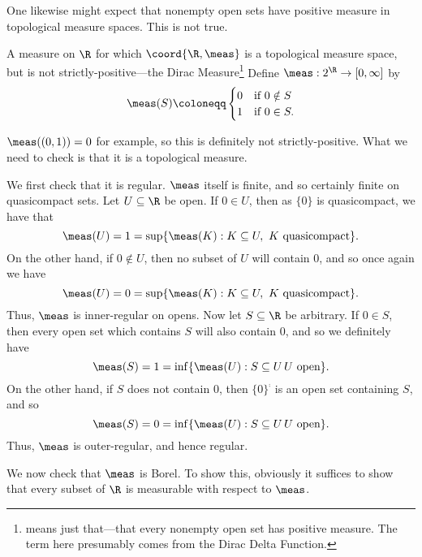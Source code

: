 One likewise might expect that nonempty open sets have positive measure in topological measure spaces.  This is not true.
\begin{exm}{A measure on $\R$ for which $\coord{\R ,\meas}$ is a topological measure space, but is not strictly-positive---the Dirac Measure}{}\footnote{ means just that---that every nonempty open set has positive measure.  The term here presumably comes from the Dirac Delta Function.}
Define $\meas :2^{\R}\rightarrow [0,\infty ]$ by
\begin{equation}
\meas (S)\coloneqq \begin{cases}0 & \text{if }0\notin S \\ 1 & \text{if }0\in S.\end{cases}
\end{equation}

$\meas ((0,1))=0$ for example, so this is definitely not strictly-positive.  What we need to check is that it is a topological measure.

We first check that it is regular.  $\meas$ itself is finite, and so certainly finite on quasicompact sets.  Let $U\subseteq \R$ be open.  If $0\in U$, then as $\{ 0\}$ is quasicompact, we have that
\begin{equation}
\meas (U)=1=\sup \{ \meas (K):K\subseteq U,\ K\text{ quasicompact}\} .
\end{equation}
On the other hand, if $0\notin U$, then no subset of $U$ will contain $0$, and so once again we have
\begin{equation}
\meas (U)=0=\sup \{ \meas (K):K\subseteq U,\ K\text{ quasicompact}\} .
\end{equation}
Thus, $\meas$ is inner-regular on opens.  Now let $S\subseteq \R$ be arbitrary.  If $0\in S$, then every open set which contains $S$ will also contain $0$, and so we definitely have
\begin{equation}
\meas (S)=1=\inf \{ \meas (U):S\subseteq U\, U\text{ open}\} .
\end{equation}
On the other hand, if $S$ does not contain $0$, then $\{ 0\} ^{\comp}$ is an open set containing $S$, and so
\begin{equation}
\meas (S)=0=\inf \{ \meas (U):S\subseteq U\, U\text{ open}\} .
\end{equation}
Thus, $\meas$ is outer-regular, and hence regular.

We now check that $\meas$ is Borel.  To show this, obviously it suffices to show that every subset of $\R$ is measurable with respect to $\meas$.


\end{exm}
